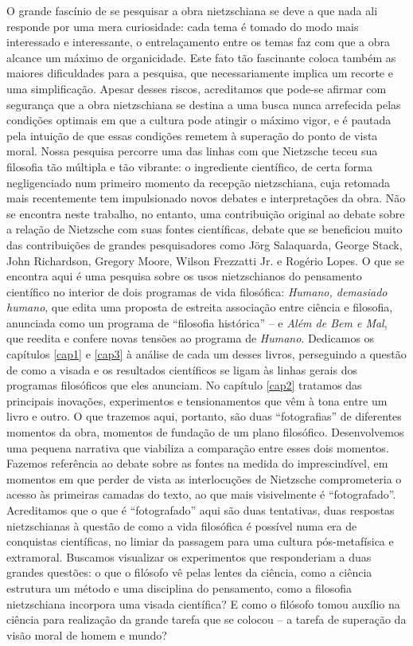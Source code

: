 \documentclass[
	12pt,				%
	openright,			%
	oneside,			%
	a4paper,			%
	english,			%
	french,				%
	spanish,			%
	brazil				%
	]{abntex2}
\begin{document}
O grande fascínio de se pesquisar a obra nietzschiana se deve a que nada ali responde por uma mera curiosidade: cada tema é tomado do modo mais interessado e interessante, o entrelaçamento entre os temas faz com que a obra alcance um máximo de organicidade. Este fato tão fascinante coloca também as maiores dificuldades para a pesquisa, que necessariamente implica um recorte e uma simplificação. Apesar desses riscos, acreditamos que pode-se afirmar com segurança que a obra nietzschiana se destina a uma busca nunca arrefecida pelas condições optimais em que a cultura pode atingir o máximo vigor, e é pautada pela intuição de que essas condições remetem à superação do ponto de vista moral. Nossa pesquisa percorre uma das linhas com que Nietzsche teceu sua filosofia tão múltipla e tão vibrante: o ingrediente científico, de certa forma negligenciado num primeiro momento da recepção nietzschiana, cuja retomada mais recentemente tem impulsionado novos debates e interpretações da obra. Não se encontra neste trabalho, no entanto, uma contribuição original ao debate sobre a relação de Nietzsche com suas fontes científicas, debate que se beneficiou muito das contribuições de grandes pesquisadores como Jörg Salaquarda, George Stack, John Richardson, Gregory Moore, Wilson Frezzatti Jr. e Rogério Lopes. O que se encontra aqui é uma pesquisa sobre os usos nietzschianos do pensamento científico no interior de dois programas de vida filosófica: \textit{Humano, demasiado humano}, que edita uma proposta de estreita associação entre ciência e filosofia, anunciada como um programa de “filosofia histórica” – e \textit{Além de Bem e Mal}, que reedita e confere novas tensões ao programa de \textit{Humano}. Dedicamos os capítulos \ref{cap1} e \ref{cap3} à análise de cada um desses livros, perseguindo a questão de como a visada e os resultados científicos se ligam às linhas gerais dos programas filosóficos que eles anunciam. No capítulo \ref{cap2} tratamos das principais inovações, experimentos e tensionamentos que vêm à tona entre um livro e outro. O que trazemos aqui, portanto, são duas “fotografias” de diferentes momentos da obra, momentos de fundação de um plano filosófico. Desenvolvemos uma pequena narrativa que viabiliza a comparação entre esses dois momentos. Fazemos referência ao debate sobre as fontes na medida do imprescindível, em momentos em que perder de vista as interlocuções de Nietzsche comprometeria o acesso às primeiras camadas do texto, ao que mais visivelmente é “fotografado”. Acreditamos que o que é “fotografado” aqui são duas tentativas, duas respostas nietzschianas à questão de como a vida filosófica é possível numa era de conquistas científicas, no limiar da passagem para uma cultura pós-metafísica e extramoral. Buscamos visualizar os experimentos que responderiam a duas grandes questões: o que o filósofo vê pelas lentes da ciência, como a ciência estrutura um método e uma disciplina do pensamento, como a filosofia nietzschiana incorpora uma visada científica? E como o filósofo tomou auxílio na ciência para realização da grande tarefa que se colocou – a tarefa de superação da visão moral de homem e mundo?
\end{document}
